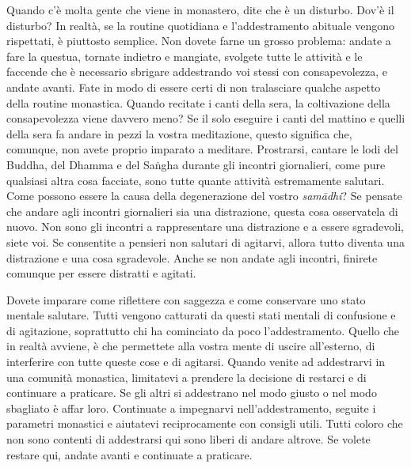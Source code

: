 Quando c'è molta gente che viene in monastero, dite che è un disturbo.
Dov'è il disturbo? In realtà, se la routine quotidiana e
l'addestramento abituale vengono rispettati, è piuttosto semplice. Non
dovete farne un grosso problema: andate a fare la questua, tornate
indietro e mangiate, svolgete tutte le attività e le faccende che è
necessario sbrigare addestrando voi stessi con consapevolezza, e andate
avanti. Fate in modo di essere certi di non tralasciare qualche aspetto
della routine monastica. Quando recitate i canti della sera, la
coltivazione della consapevolezza viene davvero meno? Se il solo
eseguire i canti del mattino e quelli della sera fa andare in pezzi la
vostra meditazione, questo significa che, comunque, non avete proprio
imparato a meditare. Prostrarsi, cantare le lodi del Buddha, del Dhamma
e del Saṅgha durante gli incontri giornalieri, come pure qualsiasi altra
cosa facciate, sono tutte quante attività estremamente salutari. Come
possono essere la causa della degenerazione del vostro \emph{samādhi}?
Se pensate che andare agli incontri giornalieri sia una distrazione,
questa cosa osservatela di nuovo. Non sono gli incontri a rappresentare
una distrazione e a essere sgradevoli, siete voi. Se consentite a
pensieri non salutari di agitarvi, allora tutto diventa una distrazione
e una cosa sgradevole. Anche se non andate agli incontri, finirete
comunque per essere distratti e agitati.

Dovete imparare come riflettere con saggezza e come conservare uno stato
mentale salutare. Tutti vengono catturati da questi stati mentali di
confusione e di agitazione, soprattutto chi ha cominciato da poco
l'addestramento. Quello che in realtà avviene, è che permettete alla
vostra mente di uscire all'esterno, di interferire con tutte queste cose
e di agitarsi. Quando venite ad addestrarvi in una comunità monastica,
limitatevi a prendere la decisione di restarci e di continuare a
praticare. Se gli altri si addestrano nel modo giusto o nel modo
sbagliato è affar loro. Continuate a impegnarvi nell'addestramento,
seguite i parametri monastici e aiutatevi reciprocamente con consigli
utili. Tutti coloro che non sono contenti di addestrarsi qui sono liberi
di andare altrove. Se volete restare qui, andate avanti e continuate a
praticare.

